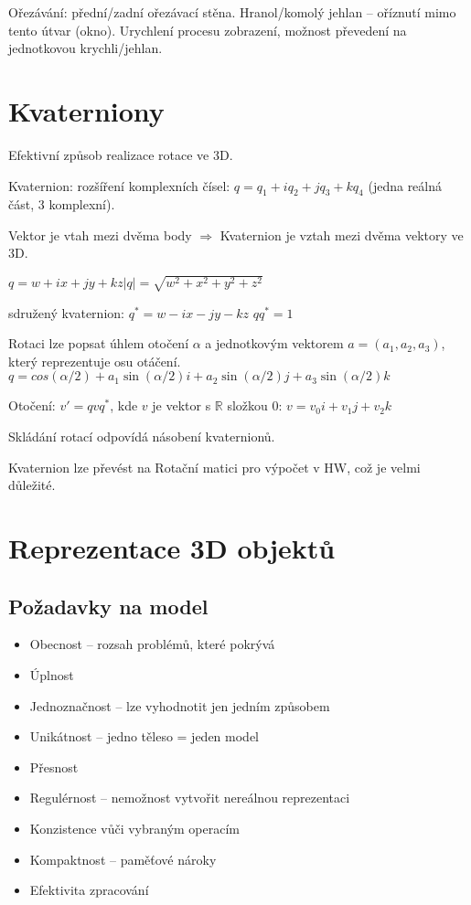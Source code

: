 \documentclass[a4paper, 11pt]{report}
\begin{document}
Ořezávání: přední/zadní ořezávací stěna. Hranol/komolý jehlan -- oříznutí mimo tento útvar (okno). Urychlení procesu zobrazení, možnost převedení na jednotkovou krychli/jehlan.

\section{Kvaterniony}

Efektivní způsob realizace rotace ve 3D.

Kvaternion: rozšíření komplexních čísel: $q = q_1 + i q_2 + j q_3 + k q_4$ (jedna reálná část, 3 komplexní).

Vektor je vtah mezi dvěma body $\Rightarrow$ Kvaternion je vztah mezi dvěma vektory ve 3D.

$q = w + i x + j y + k z$\qquad $|q| = \sqrt{w^2 + x^2 + y^2 + z^2}$

sdružený kvaternion: $q^* = w - i x - j y - k z$ \qquad $q q^* = 1$

Rotaci lze popsat úhlem otočení $\alpha$ a jednotkovým vektorem $a = (a_1, a_2, a_3)$, který reprezentuje osu otáčení. $q = cos(\alpha/2) + a_1 \sin(\alpha/2) i + a_2 \sin(\alpha/2) j + a_3 \sin(\alpha/2) k$

Otočení: $ v' = q v q^*$, kde $v$ je vektor s $\mathbb{R}$ složkou 0: $v = v_0 i + v_1 j + v_2 k$

Skládání rotací odpovídá násobení kvaternionů.

Kvaternion lze převést na Rotační matici pro výpočet v HW, což je velmi důležité.

\section{Reprezentace 3D objektů}

\subsection{Požadavky na model}
\begin{itemize}
	\item Obecnost -- rozsah problémů, které pokrývá
	\item Úplnost
	\item Jednoznačnost -- lze vyhodnotit jen jedním způsobem
	\item Unikátnost -- jedno těleso = jeden model
	\item Přesnost
	\item Regulérnost -- nemožnost vytvořit nereálnou reprezentaci
	\item Konzistence vůči vybraným operacím
	\item Kompaktnost -- paměťové nároky
	\item Efektivita zpracování
\end{itemize}
\end{document}
